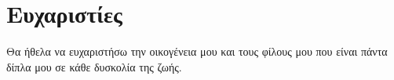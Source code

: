 \chapter*{\center \Large  Ευχαριστίες}

Θα ήθελα να ευχαριστήσω την οικογένεια μου και τους φίλους μου που είναι πάντα δίπλα μου σε κάθε δυσκολία της ζωής.




